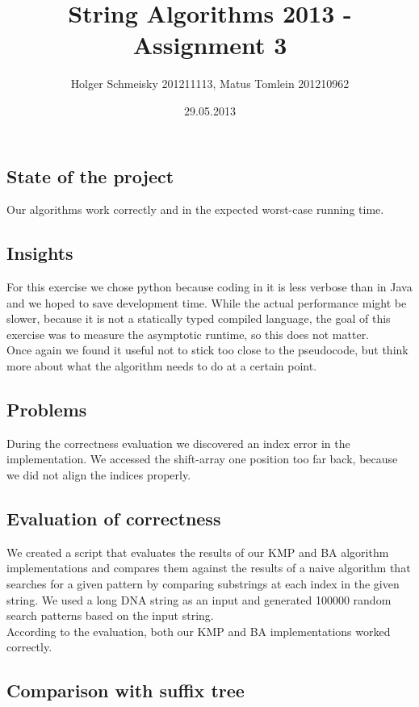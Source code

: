 \documentclass[a4paper,10pt]{article}
\title{String Algorithms 2013 - Assignment 3}
\author{Holger Schmeisky  201211113, Matus Tomlein 201210962}
\date{29.05.2013}
\begin{document}
\maketitle

\subsection*{State of the project}
Our algorithms work correctly and in the expected worst-case running time.

\subsection*{Insights}
For this exercise we chose python because coding in it is less verbose than in Java and we hoped to save development time. While the actual performance might be slower, because it is not a statically typed compiled language, the goal of this exercise was to measure the asymptotic runtime, so this does not matter.\\
Once again we found it useful not to stick too close to the pseudocode, but think more about what the algorithm needs to do at a certain point.

\subsection*{Problems}
During the correctness evaluation we discovered an index error in the implementation. We accessed the shift-array one position too far back, because we did not align the indices properly.

\subsection*{Evaluation of correctness}

We created a script that evaluates the results of our KMP and BA algorithm
implementations and compares them against the results of a naive algorithm
that searches for a given pattern by comparing substrings at each index
in the given string.
We used a long DNA string as an input and generated 100000 random search patterns
based on the input string.\\

According to the evaluation, both our KMP and BA implementations worked
correctly.

\subsection*{Comparison with suffix tree}
\end{document}
